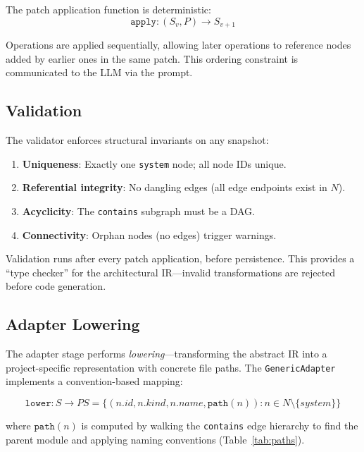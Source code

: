 \documentclass[11pt,a4paper]{article}
\begin{document}
The patch application function is deterministic:
$$\texttt{apply}: (S_v, P) \rightarrow S_{v+1}$$

Operations are applied sequentially, allowing later operations to reference nodes added by earlier ones in the same patch. This ordering constraint is communicated to the LLM via the prompt.

\subsection{Validation}

The validator enforces structural invariants on any snapshot:

\begin{enumerate}
    \item \textbf{Uniqueness}: Exactly one \texttt{system} node; all node IDs unique.
    \item \textbf{Referential integrity}: No dangling edges (all edge endpoints exist in $N$).
    \item \textbf{Acyclicity}: The \texttt{contains} subgraph must be a DAG.
    \item \textbf{Connectivity}: Orphan nodes (no edges) trigger warnings.
\end{enumerate}

Validation runs after every patch application, before persistence. This provides a ``type checker'' for the architectural IR---invalid transformations are rejected before code generation.

\subsection{Adapter Lowering}

The adapter stage performs \emph{lowering}---transforming the abstract IR into a project-specific representation with concrete file paths. The \texttt{GenericAdapter} implements a convention-based mapping:

\begin{equation}
\texttt{lower}: S \rightarrow PS = \{(n.id, n.kind, n.name, \texttt{path}(n)) : n \in N \setminus \{system\}\}
\end{equation}

where $\texttt{path}(n)$ is computed by walking the \texttt{contains} edge hierarchy to find the parent module and applying naming conventions (Table~\ref{tab:paths}).
\end{document}
